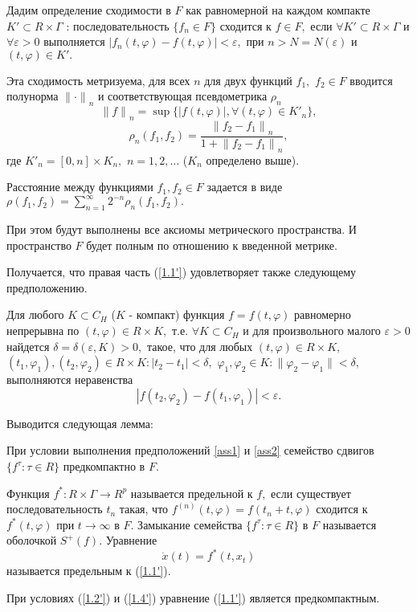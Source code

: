 	Дадим определение сходимости в $F$ как равномерной на каждом компакте
	$K'\subset R\times \Gamma $ : последовательность
	$\{f_n\in F\}$ сходится к $f\in F,$ если $\forall K'\subset
	R\times\Gamma $ и $\forall \varepsilon >0$ выполняется $|f_n(t,\varphi
	)-f(t,\varphi )|<\varepsilon,$ при $n>N=N(\varepsilon )$ и
	$(t,\varphi )\in K'.$
	
	Эта сходимость метризуема, для всех $n$ для двух функций $f_1,$
	$f_2\in F$ вводится полунорма ${\|\cdot \|}_n$ и соответствующая
	псевдометрика $\rho _n$  $${\| f\|
	}_n=\sup{\{|f(t,\varphi )|, \forall (t,\varphi )\in {K'}_n\} },$$
	$$\rho _n(f_1,f_2)=\frac{{\| f_2-f_1\| }_n}{1+{\| f_2-f_1\|
		}_n},$$ \noindent где ${K'}_n=[0,n]\times K_n,$ $n=1,2,\ldots $
	($K_n$ определено выше).
	
	Расстояние между функциями $f_1, f_2\in F$ задается в виде
	$\rho (f_1,f_2)=\sum_{n=1}^{\infty }{2^{-n}\rho _n(f_1,f_2)}.
	\label{1.3'}$
	
	При этом будут выполнены все аксиомы
	метрического пространства. И пространство
	$F$ будет полным по отношению к введенной метрике.
	
	Получается,  что правая  часть   (\ref{1.1'})   удовлетворяет   также
	следующему предположению.
	
	\begin{definition}\label{ass2} Для любого $K\subset C_H$ ($K$ - компакт)
		функция $f=f(t,\varphi )$ равномерно непрерывна по
		$(t, \varphi )\in R\times K,$ т.е. $\forall K\subset C_H$ и для произвольного малого $\varepsilon
		>0$ найдется $\delta =\delta (\varepsilon ,K)>0,$ такое, что для
		любых $(t,\varphi)\in R\times K,$ $(t_1,\varphi _1),
		(t_2,\varphi _2)\in R\times K: |t_2-t_1|<\delta,$ $\varphi _1,
		\varphi _2\in K:\|\varphi _2-\varphi _1\|<\delta,$ выполняются
		неравенства
		\begin{equation}
		|f(t_2,\varphi _2)-f(t_1,\varphi
		_1)|<\varepsilon. \label{1.4'}
		\end{equation}
	\end{definition}
	
	Выводится следующая лемма:
	
	\begin{lemma}\label{l-1.1} При условии выполнения предположений \ref{ass1} и \ref{ass2}
		семейство сдвигов $\{f^{\tau }:\tau\in R\}$
		предкомпактно в $F.$
	\end{lemma}
	
	\begin{definition}\label{d-1.1} Функция $f^*:R\times\Gamma \to R^p$ называется предельной
		к $f,$ если существует  последовательность ${t_n}$
		такая,  что ${f^{(n)}(t,\varphi )=f(t_n+t,\varphi )}$ сходится к
		$f^*(t,\varphi )$ при $t \to \infty$ в $F.$ Замыкание семейства $\{f^{\tau }:\tau \in
		R\}$ в $F$ называется оболочкой $S^+(f).$ Уравнение
		\begin{equation}
		\dot x(t)=f^*(t,x_t) \label{1.5'}
		\end{equation}
		называется предельным к (\ref{1.1'}).
	\end{definition}
	При  условиях (\ref{1.2'}) и (\ref{1.4'})
	уравнение  (\ref{1.1'}) является предкомпактным.
	
